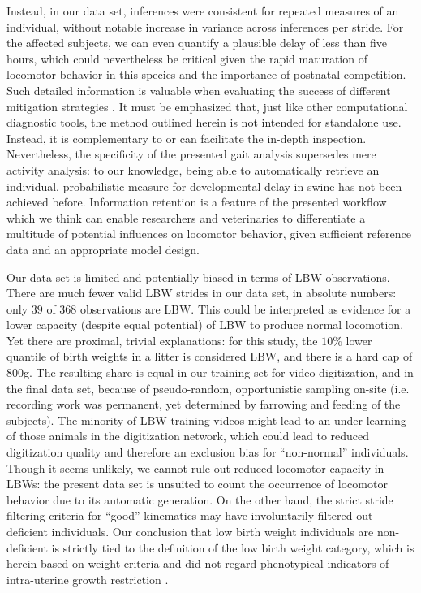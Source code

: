 Instead, in our data set, inferences were consistent for repeated measures of an individual, without notable increase in variance across inferences per stride.
For the affected subjects, we can even quantify a plausible delay of less than five hours, which could nevertheless be critical given the rapid maturation of locomotor behavior in this species \citep{VandenHole2017} and the importance of postnatal competition.
Such detailed information is valuable when evaluating the success of different mitigation strategies \citep[e.g. supplementing energy to piglets,][]{Schmitt2019}.
It must be emphasized that, just like other computational diagnostic tools, the method outlined herein is not intended for standalone use.
Instead, it is complementary to or can facilitate the in-depth inspection.
Nevertheless, the specificity of the presented gait analysis supersedes mere activity analysis: to our knowledge, being able to automatically retrieve an individual, probabilistic measure for developmental delay in swine has not been achieved before.
Information retention is a feature of the presented workflow which we think can enable researchers and veterinaries to differentiate a multitude of potential influences on locomotor behavior, given sufficient reference data and an appropriate model design.


\bigskip
Our data set is limited and potentially biased in terms of LBW observations.
There are much fewer valid LBW strides in our data set, in absolute numbers: only
\(39\)
of
\(368\)
observations are LBW.
This could be interpreted as evidence for a lower capacity (despite equal potential) of LBW to produce normal locomotion.
Yet there are proximal, trivial explanations: for this study, the \(10 \%\) lower quantile of birth weights in a litter is considered LBW, and there is a hard cap of \(800\)g.
The resulting share is equal in our training set for video digitization, and in the final data set, because of pseudo-random, opportunistic sampling on-site (i.e. recording work was permanent, yet determined by farrowing and feeding of the subjects).
The minority of LBW training videos might lead to an under-learning of those animals in the digitization network, which could lead to reduced digitization quality and therefore an exclusion bias for ``non-normal'' individuals.
Though it seems unlikely, we cannot rule out reduced locomotor capacity in LBWs: the present data set is unsuited to count the occurrence of locomotor behavior due to its automatic generation.
On the other hand, the strict stride filtering criteria for ``good'' kinematics may have involuntarily filtered out deficient individuals.
Our conclusion that low birth weight individuals are non-deficient is strictly tied to the definition of the low birth weight category, which is herein based on weight criteria and did not regard phenotypical indicators of intra-uterine growth restriction \citep[which we did not record, \textit{cf.}][]{Amdi2013}.



